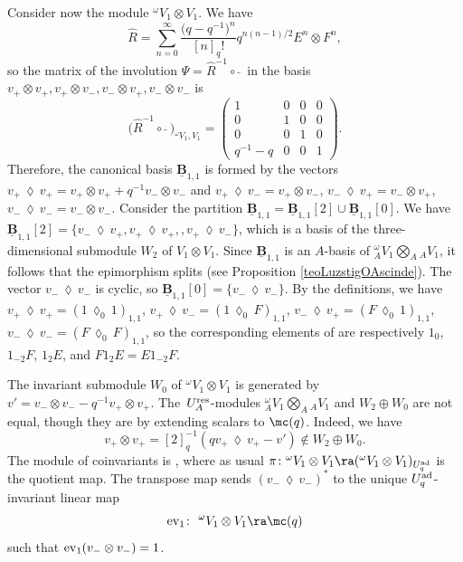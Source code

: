 \begin{exa}
{Consider now the module ${}^\omega V_1\otimes V_1$. We have
\[
\hat{R} = \sum_{n=0}^\infty \frac{\bigl(q-q^{-1}\bigr)^n}{[n]_q !} q^{n(n-1)/2} E^n\otimes F^n,
\]
 so the matrix of the involution $\Psi=\hat{R}^{-1}\circ \bar{}\ $ in the basis $v_+\otimes v_+, v_+\otimes v_-,v_-\otimes v_+,v_-\otimes v_-$ is
\[\big(\hat{R}^{-1}\circ \bar{}\ \big)_{{}^\omega V_1 ,V_1}=\begin{pmatrix} 1 &0 & 0 & 0\\0& 1& 0 &0\\0&0&1&0\\ q^{-1}-q &0&0& 1 \end{pmatrix}.\]
Therefore, the canonical basis $\underline{\mathbf{B}}_{1,1}$ is formed by the vectors $v_+ \,\lozenge\, v_+ =v_+\otimes v_+ + q^{-1} v_-\otimes v_-$ and $v_+ \,\lozenge\, v_- =v_+\otimes v_-$, $v_- \,\lozenge\, v_+ =v_-\otimes v_+ $, $v_- \,\lozenge\, v_- =v_-\otimes v_-$. Consider the partition $\underline{\mathbf{B}}_{1,1} = \underline{\mathbf{B}}_{1,1}[2] \cup \underline{\mathbf{B}}_{1,1}[0]$. We have $\underline{\mathbf{B}}_{1,1}[2] = \{v_- \,\lozenge\, v_+,v_+ \,\lozenge\, v_+, ,v_+ \,\lozenge\, v_-\}$, which is a basis of the three-dimensional submodule $W_2$ of $V_1\otimes V_1$. Since $\underline{\mathbf{B}}_{1,1}$ is an $A$-basis of ${}_A^\omega V_1\bigotimes_A {}_AV_1$, it follows that the epimorphism  splits (see Proposition \ref{teoLuzstigOAscinde}). The vector $v_- \,\lozenge\, v_-$ is cyclic, so $\underline{\mathbf{B}}_{1,1}[0]=\{v_- \,\lozenge\, v_-\}$. By the definitions, we have $v_+ \,\lozenge\, v_+ = (1 \,\lozenge_0 \, 1)_{1,1}$, $v_+ \,\lozenge\, v_- = (1 \,\lozenge_0\, F)_{1,1}$, $v_- \,\lozenge\, v_+ = (F \,\lozenge_0\, 1)_{1,1}$, $v_- \,\lozenge\, v_- = (F \,\lozenge_0\, F)_{1,1}$, so the corresponding elements of  are respectively $1_{0}$, $1_{-2}F$, $1_{2}E$, and $F1_{2}E = E1_{-2}F$.

The invariant submodule $W_0$ of ${}^\omega V_1\otimes V_1$ is generated by $v' = v_-\otimes v_- - q^{-1}v_+\otimes v_+$. The~$U_A^{\rm res}$-modules ${}_A^\omega V_1\bigotimes_A {}_AV_1$ and $W_2 \oplus W_0$ are not equal, though they are by extending scalars to $\mc(q)$. Indeed, we have
\[
v_+\otimes v_+= [2]_q^{-1}(qv_+ \,\lozenge\, v_+-v') \notin W_2 \oplus W_0.
\]
 The module of coinvariants is ,
where as usual $\pi\colon {}^\omega V_1\otimes V_1 \ra \smash{({}^\omega V_1\otimes V_1)_{U_q^{\rm ad}}}$ is the quotient map. The transpose map  sends $(v_- \,\lozenge\, v_-)^*$ to the unique $U_q^{\rm ad}$-invariant linear map
\[
{\rm ev}_1\colon\ {}^\omega V_1\otimes V_1 \ra \mc(q)
\]
 such that ${\rm ev}_1(v_- \otimes v_-)=1$.

}
\end{exa}
